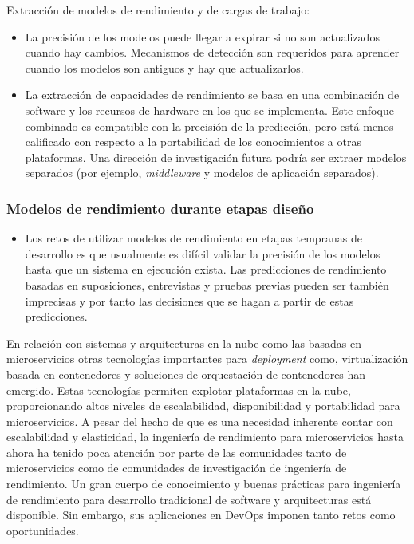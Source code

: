 \documentclass[11pt, twoside]{report}
\begin{document}
Extracción de modelos de rendimiento y de cargas de trabajo:
\begin{itemize}
    \item La precisión de los modelos puede llegar a expirar si no son actualizados cuando hay cambios. Mecanismos de detección son requeridos para aprender cuando los modelos son antiguos y hay que actualizarlos.
    \item La extracción de capacidades de rendimiento se basa en una combinación de software y los recursos de hardware en los que se implementa. Este enfoque combinado es compatible con la precisión de la predicción, pero está menos calificado con respecto a la portabilidad de los conocimientos a otras plataformas. Una dirección de investigación futura podría ser extraer modelos separados (por ejemplo, \emph{middleware} y modelos de aplicación separados). 
\end{itemize}

\subsubsection{Modelos de rendimiento durante etapas diseño }
\begin{itemize}
    \item Los retos de utilizar modelos de rendimiento en etapas tempranas de desarrollo es que usualmente es difícil validar la precisión de los modelos hasta que un sistema en ejecución exista. Las predicciones de rendimiento basadas en suposiciones, entrevistas y pruebas previas pueden ser también imprecisas y por tanto las decisiones que se hagan a partir de estas predicciones.
\end{itemize}

En relación con sistemas y arquitecturas en la nube como las basadas en microservicios otras tecnologías importantes para \emph{deployment} como, virtualización basada en contenedores y soluciones de orquestación de contenedores han emergido. Estas tecnologías permiten explotar plataformas en la nube, proporcionando altos niveles de escalabilidad, disponibilidad y portabilidad para microservicios. A pesar del hecho de que es una necesidad inherente contar con escalabilidad y elasticidad, la ingeniería de rendimiento para microservicios hasta ahora ha tenido poca atención por parte de las comunidades tanto de microservicios como de comunidades de investigación de ingeniería de rendimiento\cite{microservices-challenges}. Un gran cuerpo de conocimiento y buenas prácticas para ingeniería de rendimiento para desarrollo tradicional de software y arquitecturas está disponible. Sin embargo, sus aplicaciones en DevOps imponen tanto retos como oportunidades.
\end{document}
